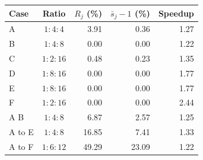 \begin{tabular}{@{}lcrrr@{}}\toprule
Case & Ratio & $R_j$ (\%) & $\bar{s}_j-1$ (\%) & Speedup \\\midrule
A & $1:4:4$ & 3.91 & 0.36 & 1.27 \\
B & $1:4:8$ & 0.00 & 0.00 & 1.22 \\
C & $1:2:16$ & 0.48 & 0.23 & 1.35 \\
D & $1:8:16$ & 0.00 & 0.00 & 1.77 \\
E & $1:8:16$ & 0.00 & 0.00 & 1.77 \\
F & $1:2:16$ & 0.00 & 0.00 & 2.44 \\
A B & $1:4:8$ & 6.87 & 2.57 & 1.25 \\
A to E & $1:4:8$ & 16.85 & 7.41 & 1.33 \\
A to F & $1:6:12$ & 49.29 & 23.09 & 1.22 \\
\bottomrule\end{tabular}
